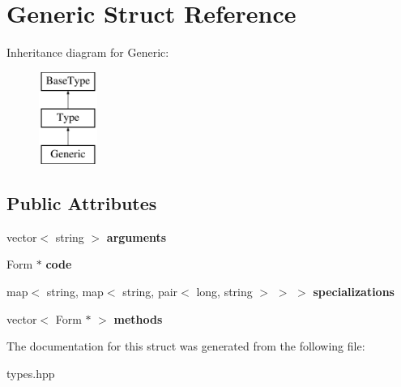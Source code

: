 \hypertarget{structGeneric}{
\section{Generic Struct Reference}
\label{structGeneric}
}
Inheritance diagram for Generic:\begin{figure}[H]
\begin{center}
\leavevmode
\includegraphics[height=3.000000cm]{structGeneric}
\end{center}
\end{figure}
\subsection*{Public Attributes}
\begin{DoxyCompactItemize}
\item 
\hypertarget{structGeneric_ad048043d5daa89f7d36f573b3ce515c1}{
vector$<$ string $>$ {\bfseries arguments}}
\label{structGeneric_ad048043d5daa89f7d36f573b3ce515c1}

\item 
\hypertarget{structGeneric_ab948d4a70418e0bc01d434a0be599486}{
Form $\ast$ {\bfseries code}}
\label{structGeneric_ab948d4a70418e0bc01d434a0be599486}

\item 
\hypertarget{structGeneric_a4518a5cdeed8d7ed927b2ac590e0e27a}{
map$<$ string, map$<$ string, pair$<$ long, string $>$ $>$ $>$ {\bfseries specializations}}
\label{structGeneric_a4518a5cdeed8d7ed927b2ac590e0e27a}

\item 
\hypertarget{structGeneric_a610e8f55b60d655b85d9d027c74657dc}{
vector$<$ Form $\ast$ $>$ {\bfseries methods}}
\label{structGeneric_a610e8f55b60d655b85d9d027c74657dc}

\end{DoxyCompactItemize}


The documentation for this struct was generated from the following file:\begin{DoxyCompactItemize}
\item 
types.hpp\end{DoxyCompactItemize}
